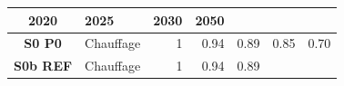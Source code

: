 \documentclass[]{article}
\begin{document}
\begin{longtable}[]{@{}clrrrrr@{}}
\begin{minipage}[b]{0.08\columnwidth}
2020\strut
\end{minipage} & \begin{minipage}[b]{0.08\columnwidth}\raggedleft\strut
2025\strut
\end{minipage} & \begin{minipage}[b]{0.08\columnwidth}\raggedleft\strut
2030\strut
\end{minipage} & \begin{minipage}[b]{0.08\columnwidth}\raggedleft\strut
2050\strut
\end{minipage}\tabularnewline
\midrule
\endhead
\begin{minipage}[t]{0.19\columnwidth}\centering\strut
\textbf{S0 P0}\strut
\end{minipage} & \begin{minipage}[t]{0.13\columnwidth}\raggedright\strut
Chauffage\strut
\end{minipage} & \begin{minipage}[t]{0.08\columnwidth}\raggedleft\strut
1\strut
\end{minipage} & \begin{minipage}[t]{0.08\columnwidth}\raggedleft\strut
0.94\strut
\end{minipage} & \begin{minipage}[t]{0.08\columnwidth}\raggedleft\strut
0.89\strut
\end{minipage} & \begin{minipage}[t]{0.08\columnwidth}\raggedleft\strut
0.85\strut
\end{minipage} & \begin{minipage}[t]{0.08\columnwidth}\raggedleft\strut
0.70\strut
\end{minipage}\tabularnewline
\begin{minipage}[t]{0.19\columnwidth}\centering\strut
\textbf{S0b REF}\strut
\end{minipage} & \begin{minipage}[t]{0.13\columnwidth}\raggedright\strut
Chauffage\strut
\end{minipage} & \begin{minipage}[t]{0.08\columnwidth}\raggedleft\strut
1\strut
\end{minipage} & \begin{minipage}[t]{0.08\columnwidth}\raggedleft\strut
0.94\strut
\end{minipage} & \begin{minipage}[t]{0.08\columnwidth}\raggedleft\strut
0.89\strut
\end{minipage} & \begin{minipage}[t]{0.08\columnwidth}\raggedleft\strut

\end{minipage}
\end{longtable}
\end{document}
